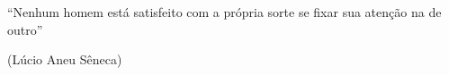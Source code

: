 
\newpage
\thispagestyle{empty}
\vspace*{\fill}
\begin{flushright}
	``Nenhum homem está satisfeito com a própria sorte se fixar sua atenção na de outro'' 
	
	(Lúcio Aneu Sêneca)
\end{flushright}